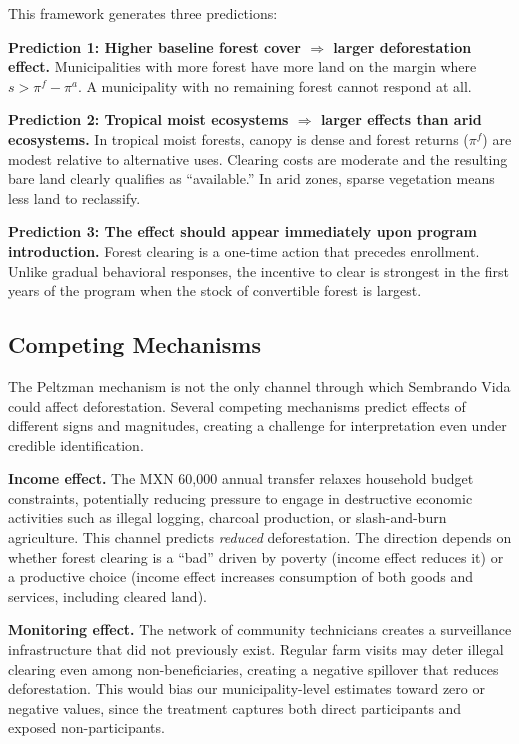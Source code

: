 \documentclass[12pt]{article}
\begin{document}
This framework generates three predictions:

\textbf{Prediction 1: Higher baseline forest cover $\Rightarrow$ larger deforestation effect.} Municipalities with more forest have more land on the margin where $s > \pi^f - \pi^a$. A municipality with no remaining forest cannot respond at all.

\textbf{Prediction 2: Tropical moist ecosystems $\Rightarrow$ larger effects than arid ecosystems.} In tropical moist forests, canopy is dense and forest returns ($\pi^f$) are modest relative to alternative uses. Clearing costs are moderate and the resulting bare land clearly qualifies as ``available.'' In arid zones, sparse vegetation means less land to reclassify.

\textbf{Prediction 3: The effect should appear immediately upon program introduction.} Forest clearing is a one-time action that precedes enrollment. Unlike gradual behavioral responses, the incentive to clear is strongest in the first years of the program when the stock of convertible forest is largest.

\subsection{Competing Mechanisms}

The Peltzman mechanism is not the only channel through which Sembrando Vida could affect deforestation. Several competing mechanisms predict effects of different signs and magnitudes, creating a challenge for interpretation even under credible identification.

\textbf{Income effect.} The MXN 60,000 annual transfer relaxes household budget constraints, potentially reducing pressure to engage in destructive economic activities such as illegal logging, charcoal production, or slash-and-burn agriculture. This channel predicts \textit{reduced} deforestation. The direction depends on whether forest clearing is a ``bad'' driven by poverty (income effect reduces it) or a productive choice (income effect increases consumption of both goods and services, including cleared land).

\textbf{Monitoring effect.} The network of community technicians creates a surveillance infrastructure that did not previously exist. Regular farm visits may deter illegal clearing even among non-beneficiaries, creating a negative spillover that reduces deforestation. This would bias our municipality-level estimates toward zero or negative values, since the treatment captures both direct participants and exposed non-participants.
\end{document}
